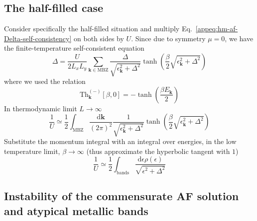 \subsection{The half-filled case}

Consider specifically the half-filled situation and multiply Eq.~\eqref{appeq:hm-af-Delta-self-consistency} on both sides by $U$. Since due to symmetry $\mu=0$, we have the finite-temperature self-consistent equation
\[
	\Delta = \frac{U}{2L_xL_y} \sum_{\mathbf{k} \in \mathrm{MBZ}} \frac{\Delta}{\sqrt{\epsilon_{\mathbf{k}}^2 + \Delta^2}} \tanh(\frac{\beta}{2} \sqrt{\epsilon_{\mathbf{k}}^2 + \Delta^2})
\]
where we used the relation
\[
	\mathrm{Th}_\mathbf{k}^{(-)}[\beta,0] = -\tanh(\frac{\beta E_\mathbf{k}}{2})
\]
In thermodynamic limit $L \to \infty$
\[
	\frac{1}{U} \simeq \frac 1 2 \int_\mathrm{MBZ} \frac{\mathrm{d}\mathbf{k}}{(2\pi)^2} \frac{1}{\sqrt{\epsilon_{\mathbf{k}}^2 + \Delta^2}} \tanh(\frac{\beta}{2} \sqrt{\epsilon_{\mathbf{k}}^2 + \Delta^2})
\]
Substitute the momentum integral with an integral over energies, in the low temperature limit, $\beta\to\infty$ (thus approximate the hyperbolic tangent with $1$)
\[
	\frac{1}{U} \simeq \frac 1 2 \int_\mathrm{bands}  \frac{\mathrm{d}\epsilon \rho(\epsilon)}{\sqrt{\epsilon^2 + \Delta^2}}
\]
\todo

\subsection{Instability of the commensurate AF solution and atypical metallic bands}\label{appsubsec:instability-af-commensurate}

